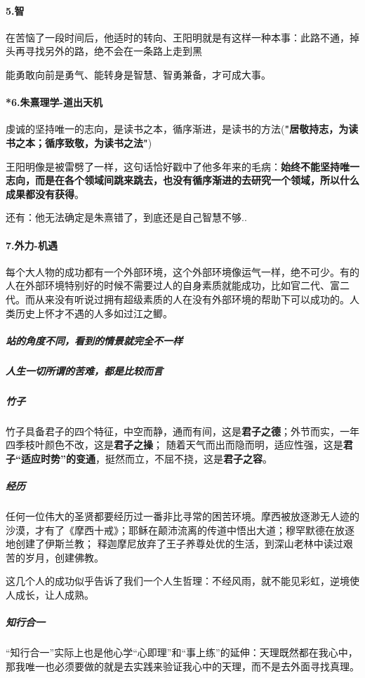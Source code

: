 \documentclass[UTF8,a4paper,8pt]{ctexart}
\begin{document}
 \paragraph{5.智}
 在苦恼了一段时间后，他适时的转向、王阳明就是有这样一种本事：此路不通，掉头再寻找另外的路，绝不会在一条路上走到黑
 
 能勇敢向前是勇气、能转身是智慧、智勇兼备，才可成大事。	
 \paragraph{*6.朱熹理学-道出天机}
 虔诚的坚持唯一的志向，是读书之本，循序渐进，是读书的方法(\textbf{"居敬持志，为读书之本；循序致敬，为读书之法"})	
 
 王阳明像是被雷劈了一样，这句话恰好戳中了他多年来的毛病：\textbf{始终不能坚持唯一志向，而是在各个领域间跳来跳去，也没有循序渐进的去研究一个领域，所以什么成果都没有获得}。
 
 还有：他无法确定是朱熹错了，到底还是自己智慧不够..
 
 \paragraph{7.外力-机遇}
 每个大人物的成功都有一个外部环境，这个外部环境像运气一样，绝不可少。有的人在外部环境特别好的时候不需要过人的自身素质就能成功，比如官二代、富二代。而从来没有听说过拥有超级素质的人在没有外部环境的帮助下可以成功的。人类历史上怀才不遇的人多如过江之鲫。
 
 \subparagraph{站的角度不同，看到的情景就完全不一样}
 \subparagraph{人生一切所谓的苦难，都是比较而言}
 
 \subparagraph{竹子}
 竹子具备君子的四个特征，中空而静，通而有间，这是\textbf{君子之德}；外节而实，一年四季枝叶颜色不改，这是\textbf{君子之操}； 随着天气而出而隐而明，适应性强，这是\textbf{君子“适应时势”的变通}，挺然而立，不屈不挠，这是\textbf{君子之容}。
 
 \subparagraph{经历}
 任何一位伟大的圣贤都要经历过一番非比寻常的困苦环境。摩西被放逐渺无人迹的沙漠，才有了《摩西十戒》；耶稣在颠沛流离的传道中悟出大道；穆罕默德在放逐地创建了伊斯兰教； 释迦摩尼放弃了王子养尊处优的生活，到深山老林中读过艰苦的岁月，创建佛教。
 
 这几个人的成功似乎告诉了我们一个人生哲理：不经风雨，就不能见彩虹，逆境使人成长，让人成熟。
 
 \subparagraph{知行合一}
 “知行合一”实际上也是他心学“心即理”和“事上练”的延伸：天理既然都在我心中，那我唯一也必须要做的就是去实践来验证我心中的天理，而不是去外面寻找真理。
 
\end{document}
